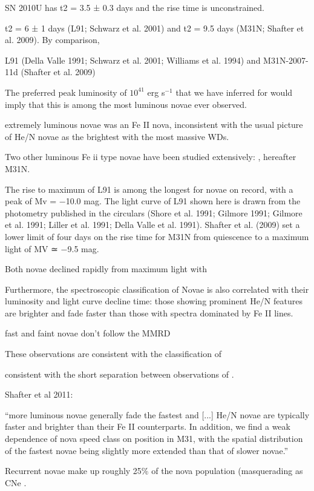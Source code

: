 SN 2010U has t2 = 3.5 ± 0.3 days and the rise time is unconstrained.

t2 = 6 ± 1 days (L91; Schwarz et al. 2001) and t2 = 9.5 days (M31N; Shafter et al. 2009). By comparison, 

L91 (Della Valle 1991; Schwarz et al. 2001; Williams et al. 1994) and M31N-2007-11d (Shafter et al. 2009)

The preferred peak luminosity of
$10^{41}$ erg s$^{-1}$ that we have inferred for \spock would imply
that this is among the most luminous novae ever observed.



extremely luminous novae \citep{Czekala:2013}
was an Fe II nova, inconsistent with the usual picture of He/N novae as the brightest with the most massive WDs.

Two other luminous Fe ii type novae have been studied extensively: , hereafter M31N.

The rise to maximum of L91 is among the longest for novae on record, with a peak of Mv = −10.0 mag. The light curve of L91 shown here is drawn from the photometry published in the circulars (Shore et al. 1991; Gilmore 1991; Gilmore et al. 1991; Liller et al. 1991; Della Valle et al. 1991). Shafter et al. (2009) set a lower limit of four days on the rise time for M31N from quiescence to a maximum light of MV ≃ −9.5 mag.

Both novae declined rapidly from maximum light with 



Furthermore, the spectroscopic classification
of Novae is also correlated with their luminosity and light curve
decline time: those showing prominent He/N features are brighter and
fade faster than those with spectra dominated by Fe II lines.

fast and faint novae don't follow the MMRD \citep{Kasliwal:2011}


   These observations are consistent with the classification of 

consistent with the
short separation between observations of \spock. 


Shafter et al 2011:

``more luminous novae generally fade the fastest and [...]  He/N novae
are typically faster and brighter than their Fe II counterparts. In
addition, we find a weak dependence of nova speed class on position in
M31, with the spatial distribution of the fastest novae being slightly
more extended than that of slower novae.''


Recurrent novae make up roughly 25\% of the nova population
(masquerading as CNe \citep{Pagnotta:2014}.
